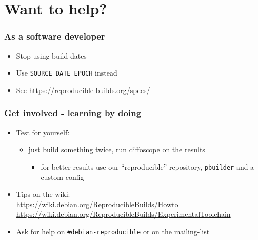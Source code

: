 \documentclass[14pt]{beamer}
\begin{document}
\section{Want to help?}

\begin{frame}
 \frametitle{As a software developer}
 \begin{itemize}
  \item Stop using build dates
  \item Use \texttt{SOURCE\_DATE\_EPOCH} instead
  \item See \url{https://reproducible-builds.org/specs/}
 \end{itemize}
\end{frame}

\begin{frame}
 \frametitle{Get involved - learning by doing}

 \begin{itemize}
  \item Test for yourself:
   \begin{itemize}
    \item just build something twice, run diffoscope on the results
    \begin{itemize}
     \item for better results use our “reproducible” repository, \texttt{pbuilder} and a custom config
    \end{itemize}
   \end{itemize}
  \item Tips on the wiki: \\
    \small{\url{https://wiki.debian.org/ReproducibleBuilds/Howto}} \\
    \small{\url{https://wiki.debian.org/ReproducibleBuilds/ExperimentalToolchain}}
  \item Ask for help on \texttt{\#debian-reproducible} or on the mailing-list
 \end{itemize}
\end{frame}
\end{document}
